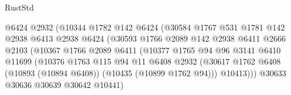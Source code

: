 \begin{lexlean}{RustStd}
\begin{coremodule}
                                    @6424
                                    @2932
                                    (@10344
                                      @1782
                                      @142
                                      @6424
                                      (@30584
                                        @1767
                                        @531
                                        @1781
                                        @142
                                        @2938
                                        @6413
                                        @2938
                                        @6424
                                        (@30593
                                          @1766
                                          @2089
                                          @142
                                          @2938
                                          @6411
                                          @2666
                                          @2103
                                          (@10367
                                            @1766
                                            @2089
                                            @6411
                                            (@10377
                                              @1765
                                              @94
                                              @96
                                              @3141
                                              @6410
                                              @11699
                                              (@10376
                                                @1763
                                                @115
                                                @94
                                                @11
                                                @6408
                                                @2932
                                                (@30617
                                                  @1762
                                                  @6408
                                                  (@10893 (@10894 @6408))
                                                  (@10435 (@10899 @1762 @94)))
                                                @10413)))
                                          @30633
                                          @30636
                                          @30639
                                          @30642
                                          @10441)

\end{coremodule}
\end{lexlean}
